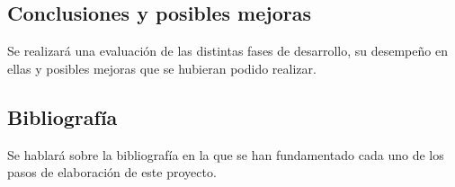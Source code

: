 \subsection{Conclusiones y posibles mejoras}

Se realizará una evaluación de las distintas fases de desarrollo, su desempeño en ellas y posibles mejoras que se hubieran podido realizar.

\subsection{Bibliografía}

Se hablará sobre la bibliografía en la que se han fundamentado cada uno de los pasos de elaboración de este proyecto.